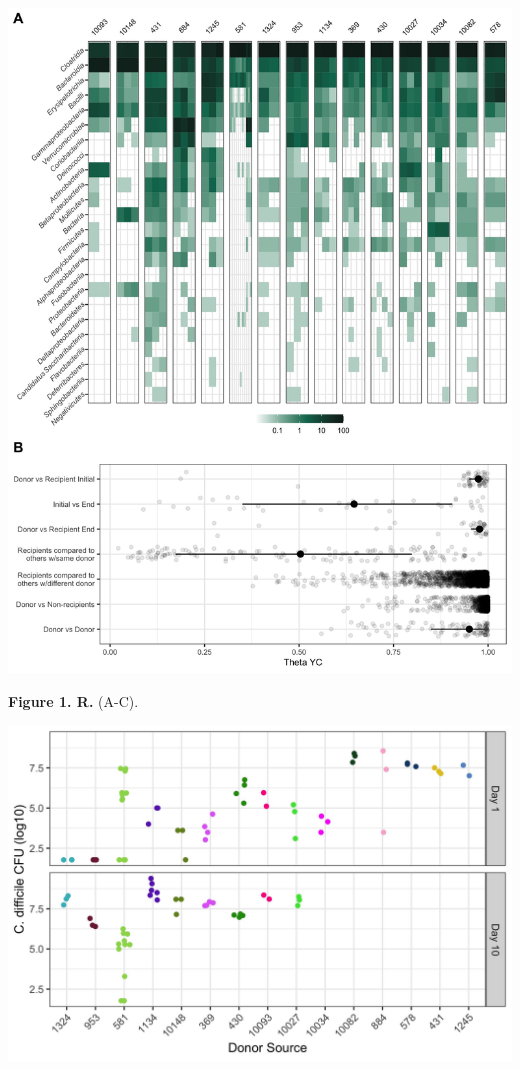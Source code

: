 \documentclass[
  12pt,
]{article}
\begin{document}
\newpage

\includegraphics{../results/figures/figure_1.jpg}

\textbf{Figure 1. R.} (A-C).

\hfill\break

\includegraphics{../results/figures/figure_2.jpg}
\end{document}
